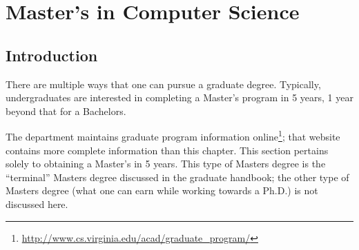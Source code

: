 \documentclass[10pt,letter]{book}
\makeatletter
\newenvironment{numlist}{
\begin{enumerate}
\setlength{\itemsep}{0pt}
\setlength{\parskip}{0pt}}
{\end{enumerate}}
\newcommand{\csminoradvisoremail}{minoradvisor@cs.virginia.edu}
\newcommand{\mychapter}[2]{\chapter{#1}\renewcommand{\leftmark}{\textsc{#2}}}
\newcommand{\mysection}[1]{\section{#1}\renewcommand{\rightmark}{#1}}
\newcommand{\myurl}[1]{\footnote{\scriptsize\url{#1}}}
\makeatother
\begin{document}
 
%
%
%
%
%
%
%


\clearpage
\mychapter{Master's in Computer Science}{Masters in CS}




\mysection{Introduction}

There are multiple ways that one can pursue a graduate degree.
Typically, undergraduates are interested in completing a Master's
program in 5 years, 1 year beyond that for a Bachelors.

The department maintains graduate program information
online\myurl{http://www.cs.virginia.edu/acad/graduate_program/}; that
website contains more complete information than this chapter.  This
section pertains solely to obtaining a Master's in 5 years.  This type
of Masters degree is the ``terminal'' Masters degree discussed in the
graduate handbook; the other type of Masters degree (what one can earn
while working towards a Ph.D.) is not discussed here.
\end{document}
